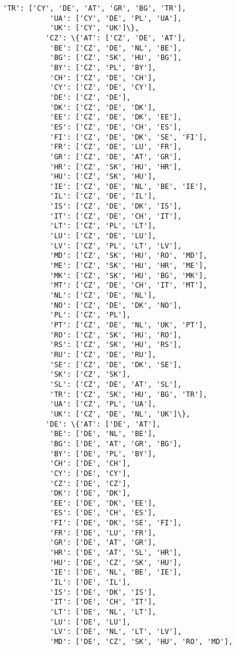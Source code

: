 \documentclass[11pt]{article}
\begin{document}
\begin{Verbatim}[commandchars=\\\{\}]
           'TR': ['CY', 'DE', 'AT', 'GR', 'BG', 'TR'],
           'UA': ['CY', 'DE', 'PL', 'UA'],
           'UK': ['CY', 'UK']\},
          'CZ': \{'AT': ['CZ', 'DE', 'AT'],
           'BE': ['CZ', 'DE', 'NL', 'BE'],
           'BG': ['CZ', 'SK', 'HU', 'BG'],
           'BY': ['CZ', 'PL', 'BY'],
           'CH': ['CZ', 'DE', 'CH'],
           'CY': ['CZ', 'DE', 'CY'],
           'DE': ['CZ', 'DE'],
           'DK': ['CZ', 'DE', 'DK'],
           'EE': ['CZ', 'DE', 'DK', 'EE'],
           'ES': ['CZ', 'DE', 'CH', 'ES'],
           'FI': ['CZ', 'DE', 'DK', 'SE', 'FI'],
           'FR': ['CZ', 'DE', 'LU', 'FR'],
           'GR': ['CZ', 'DE', 'AT', 'GR'],
           'HR': ['CZ', 'SK', 'HU', 'HR'],
           'HU': ['CZ', 'SK', 'HU'],
           'IE': ['CZ', 'DE', 'NL', 'BE', 'IE'],
           'IL': ['CZ', 'DE', 'IL'],
           'IS': ['CZ', 'DE', 'DK', 'IS'],
           'IT': ['CZ', 'DE', 'CH', 'IT'],
           'LT': ['CZ', 'PL', 'LT'],
           'LU': ['CZ', 'DE', 'LU'],
           'LV': ['CZ', 'PL', 'LT', 'LV'],
           'MD': ['CZ', 'SK', 'HU', 'RO', 'MD'],
           'ME': ['CZ', 'SK', 'HU', 'HR', 'ME'],
           'MK': ['CZ', 'SK', 'HU', 'BG', 'MK'],
           'MT': ['CZ', 'DE', 'CH', 'IT', 'MT'],
           'NL': ['CZ', 'DE', 'NL'],
           'NO': ['CZ', 'DE', 'DK', 'NO'],
           'PL': ['CZ', 'PL'],
           'PT': ['CZ', 'DE', 'NL', 'UK', 'PT'],
           'RO': ['CZ', 'SK', 'HU', 'RO'],
           'RS': ['CZ', 'SK', 'HU', 'RS'],
           'RU': ['CZ', 'DE', 'RU'],
           'SE': ['CZ', 'DE', 'DK', 'SE'],
           'SK': ['CZ', 'SK'],
           'SL': ['CZ', 'DE', 'AT', 'SL'],
           'TR': ['CZ', 'SK', 'HU', 'BG', 'TR'],
           'UA': ['CZ', 'PL', 'UA'],
           'UK': ['CZ', 'DE', 'NL', 'UK']\},
          'DE': \{'AT': ['DE', 'AT'],
           'BE': ['DE', 'NL', 'BE'],
           'BG': ['DE', 'AT', 'GR', 'BG'],
           'BY': ['DE', 'PL', 'BY'],
           'CH': ['DE', 'CH'],
           'CY': ['DE', 'CY'],
           'CZ': ['DE', 'CZ'],
           'DK': ['DE', 'DK'],
           'EE': ['DE', 'DK', 'EE'],
           'ES': ['DE', 'CH', 'ES'],
           'FI': ['DE', 'DK', 'SE', 'FI'],
           'FR': ['DE', 'LU', 'FR'],
           'GR': ['DE', 'AT', 'GR'],
           'HR': ['DE', 'AT', 'SL', 'HR'],
           'HU': ['DE', 'CZ', 'SK', 'HU'],
           'IE': ['DE', 'NL', 'BE', 'IE'],
           'IL': ['DE', 'IL'],
           'IS': ['DE', 'DK', 'IS'],
           'IT': ['DE', 'CH', 'IT'],
           'LT': ['DE', 'NL', 'LT'],
           'LU': ['DE', 'LU'],
           'LV': ['DE', 'NL', 'LT', 'LV'],
           'MD': ['DE', 'CZ', 'SK', 'HU', 'RO', 'MD'],

\end{Verbatim}
\end{document}
